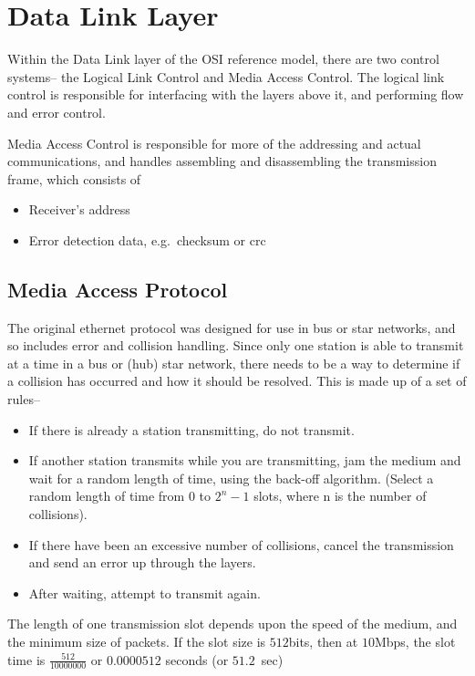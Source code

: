 
\section*{Data Link Layer}

Within the Data Link layer of the OSI reference model, there are two control systems-- the Logical Link Control and
 Media Access Control. The logical link control is responsible for interfacing with the layers above it, and performing
 flow and error control.

Media Access Control is responsible for more of the addressing and actual communications, and handles assembling and
 disassembling the transmission frame, which consists of
\begin{itemize}
  \item Receiver's address
  \item Error detection data, e.g.\ checksum or crc
\end{itemize}

\subsection*{Media Access Protocol}

The original ethernet protocol was designed for use in bus or star networks, and so includes error and collision
 handling. Since only one station is able to transmit at a time in a bus or (hub) star network, there needs to be a way
 to determine if a collision has occurred and how it should be resolved. This is made up of a set of rules--

\begin{itemize}
  \item If there is already a station transmitting, do not transmit.
  \item If another station transmits while you are transmitting, jam the medium and wait for a random length of time,
   using the back-off algorithm. (Select a random length of time from $0$ to $2^n - 1$ slots, where n is the number of
   collisions).
  \item If there have been an excessive number of collisions, cancel the transmission and send an error up through the
   layers.
  \item After waiting, attempt to transmit again.
\end{itemize}

The length of one transmission slot depends upon the speed of the medium, and the minimum size of packets. If the slot
 size is $512$bits, then at $10$Mbps, the slot time is $\frac{512}{10000000}$ or $0.0000512$ seconds (or
 $51.2$~{\textmu}sec)

